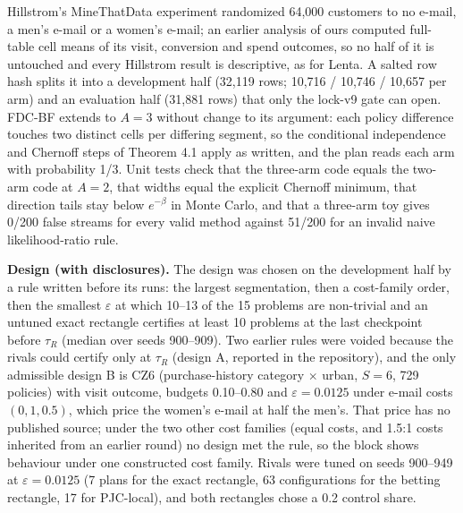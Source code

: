 \documentclass[sigconf,anonymous,review]{acmart}
\newcommand{\eps}{\varepsilon}
\begin{document}
Hillstrom's MineThatData experiment randomized 64,000 customers to no e-mail, a men's e-mail or a women's e-mail; an earlier analysis of ours computed full-table cell means of its visit, conversion and spend outcomes, so no half of it is untouched and every Hillstrom result is descriptive, as for Lenta. A salted row hash splits it into a development half (32,119 rows; 10,716 / 10,746 / 10,657 per arm) and an evaluation half (31,881 rows) that only the lock-v9 gate can open. FDC-BF extends to $A = 3$ without change to its argument: each policy difference touches two distinct cells per differing segment, so the conditional independence and Chernoff steps of Theorem 4.1 apply as written, and the plan reads each arm with probability 1/3. Unit tests check that the three-arm code equals the two-arm code at $A = 2$, that widths equal the explicit Chernoff minimum, that direction tails stay below $e^{-\beta}$ in Monte Carlo, and that a three-arm toy gives 0/200 false streams for every valid method against 51/200 for an invalid naive likelihood-ratio rule.

\textbf{Design (with disclosures).} The design was chosen on the development half by a rule written before its runs: the largest segmentation, then a cost-family order, then the smallest $\eps$ at which 10--13 of the 15 problems are non-trivial and an untuned exact rectangle certifies at least 10 problems at the last checkpoint before $\tau_R$ (median over seeds 900--909). Two earlier rules were voided because the rivals could certify only at $\tau_R$ (design A, reported in the repository), and the only admissible design B is CZ6 (purchase-history category $\times$ urban, $S = 6$, 729 policies) with visit outcome, budgets 0.10--0.80 and $\eps = 0.0125$ under e-mail costs $(0, 1, 0.5)$, which price the women's e-mail at half the men's. That price has no published source; under the two other cost families (equal costs, and 1.5:1 costs inherited from an earlier round) no design met the rule, so the block shows behaviour under one constructed cost family. Rivals were tuned on seeds 900--949 at $\eps = 0.0125$ (7 plans for the exact rectangle, 63 configurations for the betting rectangle, 17 for PJC-local), and both rectangles chose a 0.2 control share.
\end{document}
